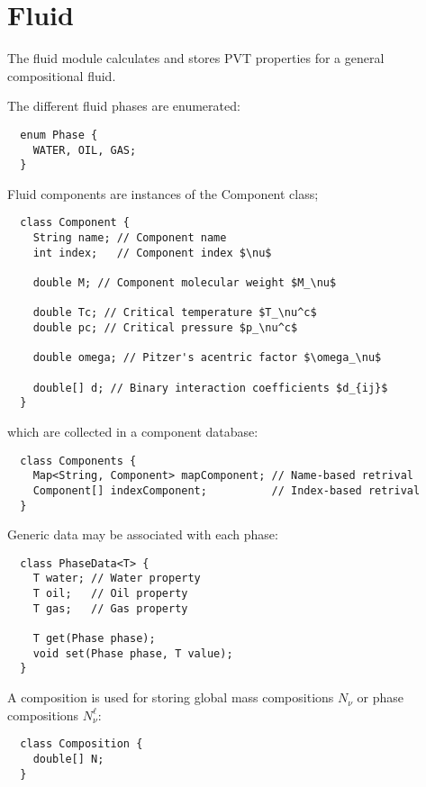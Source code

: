 \chapter{Fluid}

\minitoc

The fluid module calculates and stores PVT properties for a general
compositional fluid.



The different fluid phases are enumerated:
\begin{lstlisting}
  enum Phase {
    WATER, OIL, GAS;
  }
\end{lstlisting}
Fluid components are instances of the Component class;
\begin{lstlisting}
  class Component {
    String name; // Component name
    int index;   // Component index $\nu$

    double M; // Component molecular weight $M_\nu$

    double Tc; // Critical temperature $T_\nu^c$
    double pc; // Critical pressure $p_\nu^c$

    double omega; // Pitzer's acentric factor $\omega_\nu$

    double[] d; // Binary interaction coefficients $d_{ij}$
  }
\end{lstlisting}
which are collected in a component database:
\begin{lstlisting}
  class Components {
    Map<String, Component> mapComponent; // Name-based retrival
    Component[] indexComponent;          // Index-based retrival
  }
\end{lstlisting}

Generic data may be associated with each phase:

\begin{lstlisting}
  class PhaseData<T> {
    T water; // Water property
    T oil;   // Oil property
    T gas;   // Gas property

    T get(Phase phase);
    void set(Phase phase, T value);
  }
\end{lstlisting}

A composition is used for storing global mass compositions $N_\nu$ or
phase compositions $N_\nu^\ell$:

\begin{lstlisting}
  class Composition {
    double[] N;
  }
\end{lstlisting}

